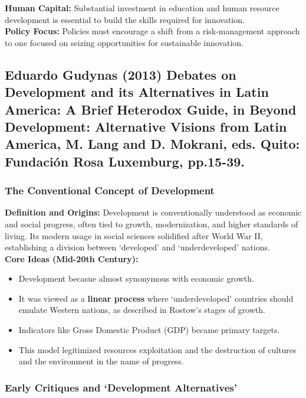 \documentclass{article}
\begin{document}
    \noindent \textbf{Human Capital:} Substantial investment in education
and human resource development is essential to build the skills required for
innovation.\\

    \noindent \textbf{Policy Focus:} Policies must encourage a shift from a
risk-management approach to one focused on seizing opportunities for
sustainable innovation.

    \subsection{Eduardo Gudynas (2013) Debates on Development and its Alternatives in Latin America: A Brief Heterodox Guide, in Beyond Development: Alternative Visions from Latin America, M. Lang and D. Mokrani, eds. Quito: Fundación Rosa Luxemburg, pp.15-39.}
    \subsubsection{The Conventional Concept of Development}

    \noindent \textbf{Definition and Origins:} Development is conventionally
understood as economic and social progress, often tied to growth,
modernization, and higher standards of living. Its modern usage in social
sciences solidified after World War II, establishing a division between
`developed' and `underdeveloped' nations.\\

    \noindent \textbf{Core Ideas (Mid-20th Century):}
    \begin{itemize}
        \item Development becasue almost synonymous with economic growth.
        \item It was viewed as a \textbf{linear process} where
        `underdeveloped' countries should emulate Western nations, as
        described in Rostow's stages of growth.
        \item Indicators like Gross Domestic Product (GDP) became primary
        targets.
        \item This model legitimized resources exploitation and the
        destruction of cultures and the environment in the name of progress.
    \end{itemize}

    \subsubsection{Early Critiques and `Development Alternatives'}
\end{document}
